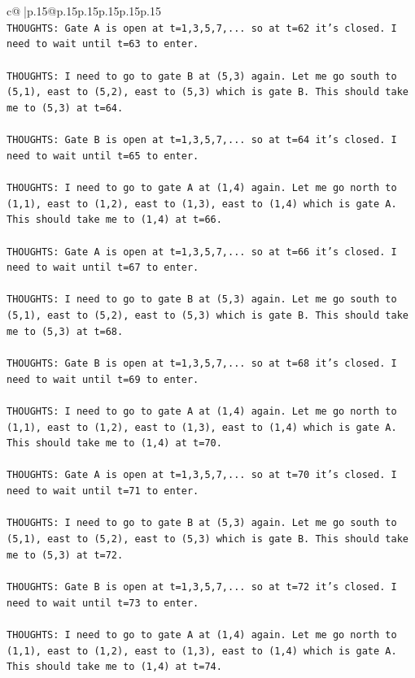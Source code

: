 \documentclass{article}
\begin{document}
{\begin{supertabular}{c@{$\;$}|p{.15\linewidth}@{}p{.15\linewidth}p{.15\linewidth}p{.15\linewidth}p{.15\linewidth}p{.15\linewidth}}
{{{\\ 
\texttt{THOUGHTS: Gate A is open at t=1,3,5,7,... so at t=62 it's closed. I need to wait until t=63 to enter.} \\
\\ 
\texttt{THOUGHTS: I need to go to gate B at (5,3) again. Let me go south to (5,1), east to (5,2), east to (5,3) which is gate B. This should take me to (5,3) at t=64.} \\
\\ 
\texttt{THOUGHTS: Gate B is open at t=1,3,5,7,... so at t=64 it's closed. I need to wait until t=65 to enter.} \\
\\ 
\texttt{THOUGHTS: I need to go to gate A at (1,4) again. Let me go north to (1,1), east to (1,2), east to (1,3), east to (1,4) which is gate A. This should take me to (1,4) at t=66.} \\
\\ 
\texttt{THOUGHTS: Gate A is open at t=1,3,5,7,... so at t=66 it's closed. I need to wait until t=67 to enter.} \\
\\ 
\texttt{THOUGHTS: I need to go to gate B at (5,3) again. Let me go south to (5,1), east to (5,2), east to (5,3) which is gate B. This should take me to (5,3) at t=68.} \\
\\ 
\texttt{THOUGHTS: Gate B is open at t=1,3,5,7,... so at t=68 it's closed. I need to wait until t=69 to enter.} \\
\\ 
\texttt{THOUGHTS: I need to go to gate A at (1,4) again. Let me go north to (1,1), east to (1,2), east to (1,3), east to (1,4) which is gate A. This should take me to (1,4) at t=70.} \\
\\ 
\texttt{THOUGHTS: Gate A is open at t=1,3,5,7,... so at t=70 it's closed. I need to wait until t=71 to enter.} \\
\\ 
\texttt{THOUGHTS: I need to go to gate B at (5,3) again. Let me go south to (5,1), east to (5,2), east to (5,3) which is gate B. This should take me to (5,3) at t=72.} \\
\\ 
\texttt{THOUGHTS: Gate B is open at t=1,3,5,7,... so at t=72 it's closed. I need to wait until t=73 to enter.} \\
\\ 
\texttt{THOUGHTS: I need to go to gate A at (1,4) again. Let me go north to (1,1), east to (1,2), east to (1,3), east to (1,4) which is gate A. This should take me to (1,4) at t=74.} \\
}}}
\end{supertabular}}
\end{document}
